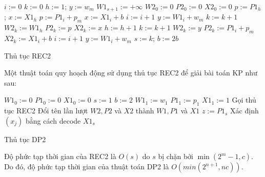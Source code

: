 \begin{algorithm}[H]
    \scriptsize
    \DontPrintSemicolon
    \vspace{1em}
    \vspace{1em}
    $i:=0$\;
    $k:=0$\;
    $h:=1$;\;
    $y:=w_m$\;
    $W1_{s+1} := +\infty$\;
    $W2_0 := 0$\;
    $P2_0 := 0$\;
    $X2_0 := 0$\;
    {
        {
            $p:=P1_h$;
            $x:=X1_h$\;
            {
                {
                    $p:= P1_i + p_m$\;
                    $x:=X1_i + b$\;
                }
                $i:=i+1$\;
                $y:=W1_i + w_m$\;
            }
            {
                $k:= k + 1$\;
                $W2_k :=  W1_h$\;
                $P2_k:=p$\;
                $X2_k := x$\;
            }
            $h:= h + 1$\;
        }
        \Else
        {
            {
                $k:=k+1$\;
                $W2_k := y$\;
                $P2_k := P1_i + p_m$\;
                $X2_k := X1_i + b$\;
            }
            $i := i + 1$\;
            $y := W1_i + w_m$\;
        }
        $s := k$;
        $b := 2b$\;
    }
    \caption{Thủ tục REC2}
    \label{algo:rec2}
\end{algorithm}

Một thuật toán quy hoạch động sử dụng thủ tục REC2 để giải bài toán KP như sau:

\begin{algorithm}[H]
    \DontPrintSemicolon
    \vspace{1em}
    \vspace{1em}
    $W1_0 := 0$\;
    $P1_0 := 0$\;
    $X1_0 := 0$\;
    $s:=1$\;
    $b:=2$\;
    $W1_1 := w_1$\;
    $P1_1 := p_1$\;
    $X1_1 := 1$\;
    {
        Gọi thủ tục REC2\;
        Đổi tên lần lượt $W2, P2$ và $X2$ thành $W1, P1$ và $X1$\;
    }
    $z := P1_s$\;
    Xác định $(x_j)$ bằng cách decode $X1_s$\;
    \caption{Thủ tục DP2}
    \label{algo:dp2}
\end{algorithm}

Độ phức tạp thời gian của REC2 là $O(s)$ do $s$ bị chặn bởi $\min(2^{m} -  1, c)$. Do đó, độ phức tạp thời gian của thuật toán DP2 là $O(min(2^{n+1}, nc))$.

